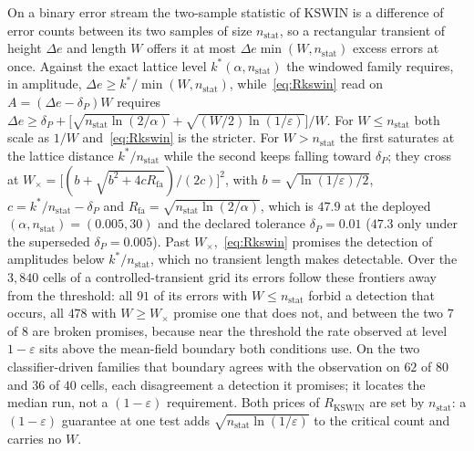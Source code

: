 \begin{remark}\label{rem:window_requirement}
  On a binary error stream the two-sample statistic of KSWIN is a difference of error counts
  between its two samples of size $n_{\mathrm{stat}}$, so a rectangular transient of height
  $\Delta e$ and length $W$ offers it at most $\Delta e \min(W, n_{\mathrm{stat}})$ excess errors
  at once. Against the exact lattice level $k^*(\alpha, n_{\mathrm{stat}})$ the windowed family
  requires, in amplitude, $\Delta e \ge k^*/\min(W, n_{\mathrm{stat}})$, while~\eqref{eq:Rkswin}
  read on $A = (\Delta e - \delta_P) W$ requires
  $\Delta e \ge \delta_P + \bigl[\sqrt{n_{\mathrm{stat}} \ln(2/\alpha)}
  + \sqrt{(W/2)\ln(1/\varepsilon)}\bigr]/W$. For $W \le n_{\mathrm{stat}}$ both scale as $1/W$
  and~\eqref{eq:Rkswin} is the stricter. For $W > n_{\mathrm{stat}}$ the first saturates at the
  lattice distance $k^*/n_{\mathrm{stat}}$ while the second keeps falling toward $\delta_P$; they
  cross at $W_\times = \bigl[(b + \sqrt{b^2 + 4 c R_{\mathrm{fa}}})/(2c)\bigr]^2$, with
  $b = \sqrt{\ln(1/\varepsilon)/2}$, $c = k^*/n_{\mathrm{stat}} - \delta_P$ and
  $R_{\mathrm{fa}} = \sqrt{n_{\mathrm{stat}}\ln(2/\alpha)}$, which is $47.9$ at the deployed
  $(\alpha, n_{\mathrm{stat}}) = (0.005, 30)$ and the declared tolerance
  $\delta_P = 0.01$ ($47.3$ only under the superseded $\delta_P = 0.005$). Past $W_\times$,~\eqref{eq:Rkswin} promises the
  detection of amplitudes below $k^*/n_{\mathrm{stat}}$, which no transient length makes
  detectable. Over the $3{,}840$ cells of a controlled-transient grid its errors follow these
  frontiers away from the threshold: all $91$ of its errors with $W \le n_{\mathrm{stat}}$ forbid a
  detection that occurs, all $478$ with $W \ge W_\times$ promise one that does not, and between
  the two $7$ of $8$ are broken promises, because near the threshold the rate observed at level
  $1 - \varepsilon$ sits above the mean-field boundary both conditions use. On the two
  classifier-driven families that boundary agrees with the observation on $62$ of $80$ and $36$ of
  $40$ cells, each disagreement a detection it promises; it locates the median run, not a
  $(1 - \varepsilon)$ requirement. Both prices of $R_{\mathrm{KSWIN}}$ are set by
  $n_{\mathrm{stat}}$: a $(1 - \varepsilon)$ guarantee at one test adds
  $\sqrt{n_{\mathrm{stat}} \ln(1/\varepsilon)}$ to the critical count and carries no $W$.
\end{remark}


